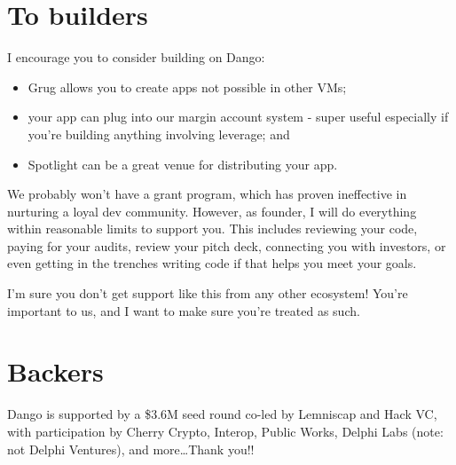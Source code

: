 \documentclass{article}
\newcommand{\image}[2]{%
  \begin{center}
    \makebox[\textwidth]{ \texttt{[image: \#1]}}%
  \end{center}
  \begin{center}
    \captionsetup{type=figure}
    \captionof{figure}{#2}
  \end{center}
}
\begin{document}
\section{To builders}

I encourage you to consider building on Dango:

\begin{itemize}
  \item Grug allows you to create apps not possible in other VMs;
  \item your app can plug into our margin account system - super useful especially if you're building anything involving leverage; and
  \item Spotlight can be a great venue for distributing your app.
\end{itemize}

We probably won't have a grant program, which has proven ineffective in nurturing a loyal dev community. However, as founder, I will do everything within reasonable limits to support you. This includes reviewing your code, paying for your audits, review your pitch deck, connecting you with investors, or even getting in the trenches writing code if that helps you meet your goals.

I'm sure you don't get support like this from any other ecosystem! You're important to us, and I want to make sure you're treated as such.

\section{Backers}

Dango is supported by a \$3.6M seed round co-led by Lemniscap\supercite{lemniscap} and Hack VC,\supercite{hackvc} with participation by Cherry Crypto,\supercite{cherrycrypto} Interop,\supercite{interop} Public Works,\supercite{publicworks} Delphi Labs\supercite{delphilabs} (note: not Delphi Ventures), and more\dots Thank you!!

\image{images/12-backers.jpeg}{Backers}

\printbibliography
\end{document}
